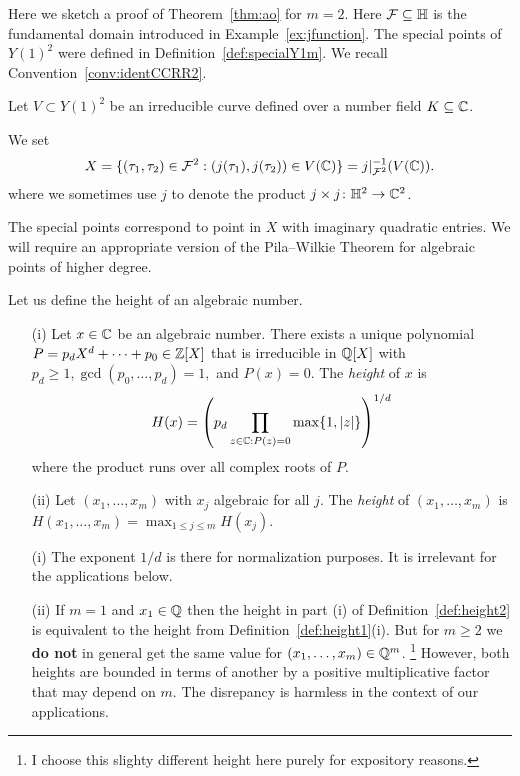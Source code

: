 Here we sketch a proof of Theorem~\ref{thm:ao} for $m=2$. Here ${\mathcal F}
\subseteq{\mathbb{H}}$ is the fundamental domain introduced in
Example~\ref{ex:jfunction}. The special points of $Y(1)^2$ were
defined in Definition~\ref{def:specialY1m}. We recall
Convention~\ref{conv:identCCRR2}. 

Let $V\subset Y(1)^2$ be an irreducible curve defined over a number
field $K\subseteq {\mathbb{C}}$.

We set
\begin{equation*}
  X = \{(\tau_1,\tau_2) \in {\mathcal F}^2 : (j(\tau_1),j(\tau_2)) \in V({\mathbb{C}}) \} =
  j|_{{\mathcal F}^2}^{-1}(V({\mathbb{C}})). 
\end{equation*}
where we sometimes use $j$ to denote the product
$j\times j\colon {\mathbb{H}}^2\rightarrow{\mathbb{C}}^2$.

The special points correspond to point in $X$ with imaginary quadratic
entries. We will require an appropriate version of the Pila--Wilkie
Theorem for algebraic points of higher degree.

Let us define the height of an algebraic number.

\begin{definition}
  \label{def:height2}
  
  \begin{enumerate}
  \item [(i)] Let $x\in{\mathbb{C}}$ be an algebraic number. There exists
    a unique polynomial $P=p_dX^d+\cdots+p_0\in {\mathbb{Z}}[X]$ that is
    irreducible in ${\mathbb{Q}}[X]$ with $p_d\ge
    1,
    \gcd(p_0,\ldots,p_d)=1,$ and $P(x)=0$. The \emph{height} of $x$
    is
    \begin{equation*}
      H(x) = \left(p_d \prod_{z\in {\mathbb{C}} : P(z)=0} \max\{1,|z|\}\right)^{1/d}
    \end{equation*}
    where the product runs over all complex roots of $P$.
  \item[(ii)] Let $(x_1,\ldots,x_m)$ with $x_j$
    algebraic for all $j$. The \emph{height} of
    $(x_1,\ldots,x_m)$ is
    $H(x_1,\ldots,x_m) = \max_{1\le j\le m}H(x_j)$. 
  \end{enumerate}
\end{definition}

\begin{remark}
  \begin{enumerate}
  \item [(i)] The exponent $1/d$ is there for normalization purposes.
    It is irrelevant for the  applications below.
  \item[(ii)] If $m=1$ and $x_1\in{\mathbb{Q}}$ then the height in part (i) of
    Definition~\ref{def:height2} is equivalent to the height from
    Definition~\ref{def:height1}(i). But for $m\ge 2$ we \textbf{do not} in
    general get the same value for $(x_1,\ldots,x_m)\in{\mathbb{Q}}^m$.
    \footnote{I choose this
      slighty different height here purely for expository reasons.}
    However, both heights are
    bounded in terms of another by a positive multiplicative factor that may
    depend on $m$.
    The disrepancy is harmless in the context of our applications. 
  \end{enumerate}
\end{remark}

